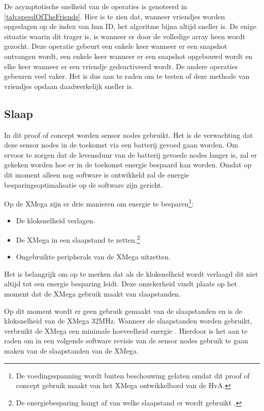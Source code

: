 De asymptotische snelheid van de operaties is genoteerd in \autoref{tab:speedOfTheFriends}. Hier is te zien dat, wanneer vriendjes worden opgeslagen op de index van hun ID, het algoritme bijna altijd sneller is. De enige situatie waarin dit trager is, is wanneer er door de volledige array heen wordt gezocht. Deze operatie gebeurt een enkele keer wanneer er een snapshot ontvangen wordt, een enkele keer wanneer er een snapshot opgebouwd wordt en elke keer wanneer er een vriendje gedeactiveerd wordt. De andere operaties gebeuren veel vaker. Het is dus aan te raden om te testen of deze methode van vriendjes opslaan daadwerkelijk sneller is.

\subsection{Slaap}
In dit proof of concept worden sensor nodes gebruikt. Het is de verwachting dat deze sensor nodes in de toekomst via een batterij gevoed gaan worden. Om ervoor te zorgen dat de levensduur van de batterij gevoede nodes langer is, zal er gekeken worden hoe er in de toekomst energie bespaard kan worden. Omdat op dit moment alleen nog software is ontwikkeld zal de energie besparingsoptimalisatie op de software zijn gericht. 

Op de XMega zijn er drie manieren om energie te besparen\footnote{De voedingsspanning wordt buiten beschouwing gelaten omdat dit proof of concept gebruik maakt van het XMega ontwikkelbord van de HvA.}:
\begin{itemize}
    \item De kloksnelheid verlagen.
    \item De XMega in een slaapstand te zetten.\footnote{De energiebesparing hangt af van welke slaapstand er wordt gebruikt \cite{XMegaDatasheet}.}
    \item Ongebruikte peripherals van de XMega uitzetten.
\end{itemize} 
Het is belangrijk om op te merken dat als de kloksnelheid wordt verlaagd dit niet altijd tot een energie besparing leidt. Deze onzekerheid vindt plaats op het moment dat de XMega gebruik maakt van slaapstanden. 

Op dit moment wordt er geen gebruik gemaakt van de slaapstanden en is de kloksnelheid van de XMega 32MHz. Wanneer de slaapstanden worden gebruikt, verbruikt de XMega een minimale hoeveelheid energie \cite{XMegaDatasheet}. Hierdoor is het aan te raden om in een volgende software revisie van de sensor nodes gebruik te gaan maken van de slaapstanden van de XMega. 



